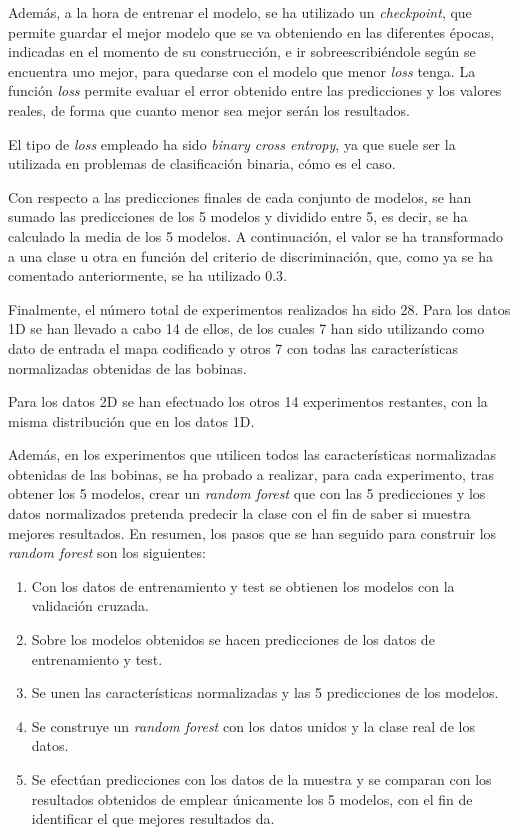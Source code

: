 Además, a la hora de entrenar el modelo, se ha utilizado un \emph{checkpoint}, que permite guardar el mejor modelo que se va obteniendo en las diferentes épocas, indicadas en el momento de su construcción, e ir sobreescribiéndole según se encuentra uno mejor, para quedarse con el modelo que menor \emph{loss} tenga. La función \emph{loss} permite evaluar el error obtenido entre las predicciones y los valores reales, de forma que cuanto menor sea mejor serán los resultados.

El tipo de \emph{loss} empleado ha sido \emph{binary cross entropy}, ya que suele ser la utilizada en problemas de clasificación binaria, cómo es el caso.

Con respecto a las predicciones finales de cada conjunto de modelos, se han sumado las predicciones de los 5 modelos y dividido entre 5, es decir, se ha calculado la media de los 5 modelos. A continuación, el valor se ha transformado a una clase u otra en función del criterio de discriminación, que, como ya se ha comentado anteriormente, se ha utilizado 0.3.

Finalmente, el número total de experimentos realizados ha sido 28. Para los datos 1D se han llevado a cabo 14 de ellos, de los cuales 7 han sido utilizando como dato de entrada el mapa codificado y otros 7 con todas las características normalizadas obtenidas de las bobinas.

Para los datos 2D se han efectuado los otros 14 experimentos restantes, con la misma distribución que en los datos 1D.

Además, en los experimentos que utilicen todos las características normalizadas obtenidas de las bobinas, se ha probado a realizar, para cada experimento, tras obtener los 5 modelos, crear un \emph{random forest} que con las 5 predicciones y los datos normalizados pretenda predecir la clase con el fin de saber si muestra mejores resultados. En resumen, los pasos que se han seguido para construir los \emph{random forest} son los siguientes:
\begin{enumerate}
    \item Con los datos de entrenamiento y test se obtienen los modelos con la validación cruzada.
    \item Sobre los modelos obtenidos se hacen predicciones de los datos de entrenamiento y test.
    \item Se unen las características normalizadas y las 5 predicciones de los modelos.
    \item Se construye un \emph{random forest} con los datos unidos y la clase real de los datos.
    \item Se efectúan predicciones con los datos de la muestra y se comparan con los resultados obtenidos de emplear únicamente los 5 modelos, con el fin de identificar el que mejores resultados da.
\end{enumerate}


